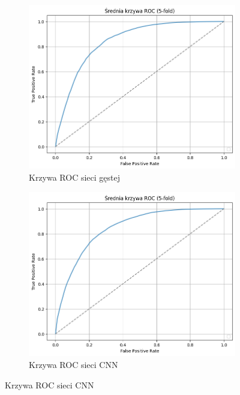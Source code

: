 \documentclass[a4paper,twoside,12pt]{book}
\begin{document}
\begin{figure}[!ht]
	\centering
	\caption{Średnie krzywe ROC dla nauki bezcechowej}\
	\label{roc_bezcech}
	\begin{subfigure}[b]{0.49\textwidth}
		\centering
		\includegraphics[width=\linewidth]{img/r5/kfold/bezcech_dense_roc_auc_0_85.png}
		\caption{Krzywa ROC sieci gęstej}
		\label{fig:dense}
	\end{subfigure}
	\hfill
	\begin{subfigure}[b]{0.49\textwidth}
		\centering
		\includegraphics[width=\linewidth]{img/r5/kfold/bezcech_CNN_roc_auc_0_84.png}
		\caption{Krzywa ROC sieci CNN}

\end{subfigure}
\end{figure}
\end{document}
